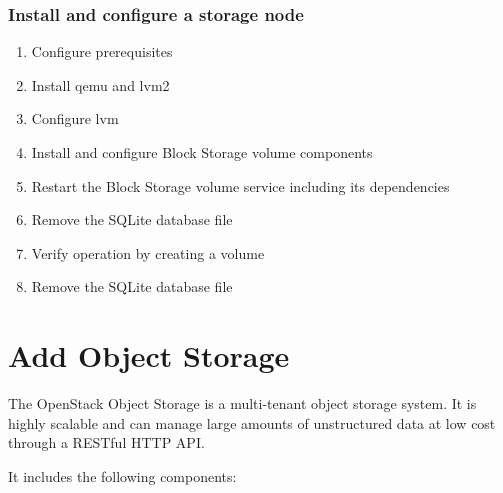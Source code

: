    \subsubsection{Install and configure a storage node}
        \begin{enumerate}
            \item Configure prerequisites
            \item Install qemu and lvm2
            \item Configure lvm
            \item Install and configure Block Storage volume components
            \item Restart the Block Storage volume service including its dependencies
            \item Remove the SQLite database file
            \item Verify operation by creating a volume
            \item Remove the SQLite database file
        \end{enumerate}   
\section{Add Object Storage}

    \par The OpenStack Object Storage is a multi-tenant object storage system. It is highly scalable and can manage large amounts of unstructured data at low cost through a RESTful HTTP API.

    \par It includes the following components:
    
